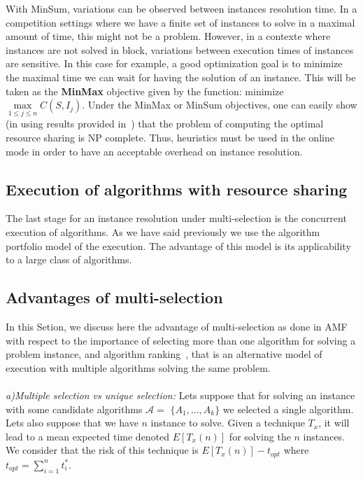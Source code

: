 With MinSum, variations can be observed between instances resolution time. In a competition settings 
where we have a finite set of instances to solve in a maximal amount of time, this might not be a problem. However, in a contexte where instances are not solved in block, variations between 
execution times of instances are sensitive. In this case for example, a good optimization goal 
is to minimize the maximal time we can wait for having the solution of an instance. This will be
taken as the 
\textbf{MinMax} objective given by the function: minimize $\underset{1 \leq j \leq n}{\max} C(S, I_j)$. 
Under the MinMax or MinSum objectives, one can easily show (in using results provided in~\cite{APDCM}) that the problem of computing the optimal resource sharing is NP complete. Thus, heuristics must 
 be used  in the online mode in order to have an acceptable overhead on instance resolution.

\subsection{Execution of algorithms with resource sharing}

The last stage for an instance resolution under multi-selection is the concurrent execution of algorithms. As we have said 
previously we use the algorithm portfolio model of the execution. The advantage of this model is its applicability to a 
large class of algorithms.

\subsection{Advantages of  multi-selection}

In this Setion, we discuss here the advantage of multi-selection as done in AMF with respect to 
the importance of selecting more than one algorithm for solving a problem instance, and 
algorithm ranking~\cite{Satzilla,MultiMethod}, that is an alternative model of execution with multiple algorithms 
solving the same problem.\\\\
\textit{a)Multiple selection vs unique selection: } 
Lets suppose that for solving an instance with some candidate algorithms $\mathcal{A} = $ $\{A_1, \dots, A_k\}$ we selected
 a single algorithm. Lets also suppose that we have $n$ instance to solve. Given a technique $T_x$, 
it will lead to a mean expected time denoted $E[T_x(n)]$ for solving the $n$ instances. We consider that the risk of this technique is $E[T_x(n)] - t_{opt}$ where $t_{opt}  = \sum_{i = 1}^n t_i^*$.

